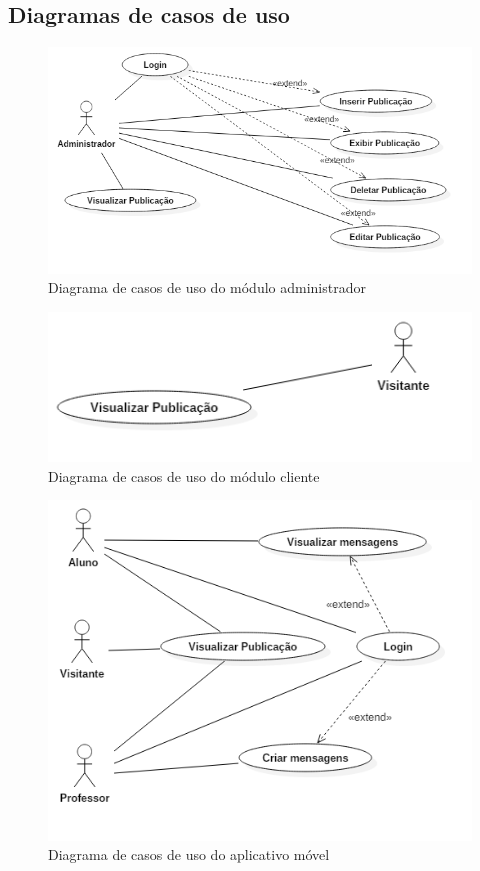 \subsection{Diagramas de casos de uso}
\begin{figure}[H]
    \centering
    \includegraphics[width=\textwidth]{figuras/casosDeUsoADM}
    \caption{Diagrama de casos de uso do módulo administrador}
\end{figure}

\begin{figure}[H]
    \centering
    \includegraphics[width=\textwidth]{figuras/CasosDeUsoCliente}
    \caption{Diagrama de casos de uso do módulo cliente}
\end{figure}

\begin{figure}[H]
    \centering
    \includegraphics[width=\textwidth]{figuras/CasosDeUsoMobile}
    \caption{Diagrama de casos de uso do aplicativo móvel}
\end{figure}

